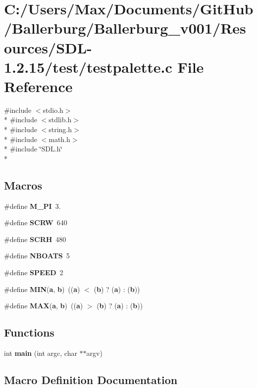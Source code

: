 \section{C\+:/\+Users/\+Max/\+Documents/\+Git\+Hub/\+Ballerburg/\+Ballerburg\+\_\+v001/\+Resources/\+S\+D\+L-\/1.2.15/test/testpalette.c File Reference}
\label{testpalette_8c}
{\ttfamily \#include $<$stdio.\+h$>$}\\*
{\ttfamily \#include $<$stdlib.\+h$>$}\\*
{\ttfamily \#include $<$string.\+h$>$}\\*
{\ttfamily \#include $<$math.\+h$>$}\\*
{\ttfamily \#include \char`\"{}S\+D\+L.\+h\char`\"{}}\\*
\subsection*{Macros}
\begin{DoxyCompactItemize}
\item 
\#define {\bf M\+\_\+\+P\+I}~3.
\item 
\#define {\bf S\+C\+R\+W}~640
\item 
\#define {\bf S\+C\+R\+H}~480
\item 
\#define {\bf N\+B\+O\+A\+T\+S}~5
\item 
\#define {\bf S\+P\+E\+E\+D}~2
\item 
\#define {\bf M\+I\+N}({\bf a},  {\bf b})~(({\bf a}) $<$ ({\bf b}) ? ({\bf a}) \+: ({\bf b}))
\item 
\#define {\bf M\+A\+X}({\bf a},  {\bf b})~(({\bf a}) $>$ ({\bf b}) ? ({\bf a}) \+: ({\bf b}))
\end{DoxyCompactItemize}
\subsection*{Functions}
\begin{DoxyCompactItemize}
\item 
int {\bf main} (int argc, char $\ast$$\ast$argv)
\end{DoxyCompactItemize}


\subsection{Macro Definition Documentation}
